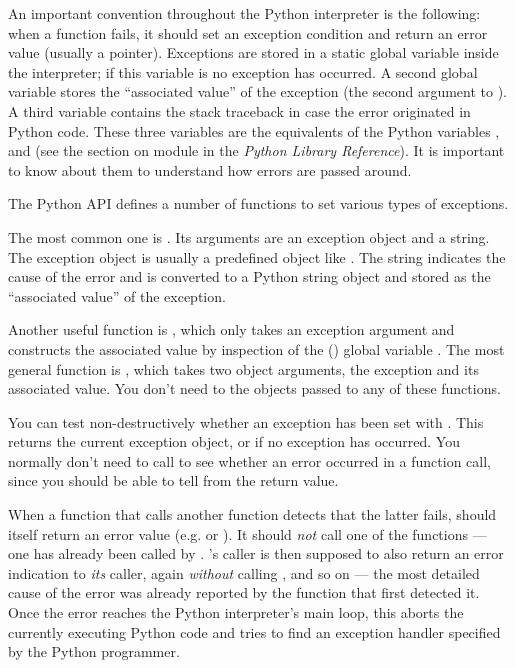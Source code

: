 \documentclass{manual}
\begin{document}
An important convention throughout the Python interpreter is the
following: when a function fails, it should set an exception condition
and return an error value (usually a \NULL{} pointer).  Exceptions
are stored in a static global variable inside the interpreter; if this
variable is \NULL{} no exception has occurred.  A second global
variable stores the ``associated value'' of the exception (the second
argument to ).  A third variable contains the stack
traceback in case the error originated in Python code.  These three
variables are the \C{} equivalents of the Python variables
,  and 
(see the section on module  in the \emph{Python Library
Reference}).  It is important to know about them to understand how
errors are passed around.

The Python API defines a number of functions to set various types of
exceptions.

The most common one is .  Its arguments
are an exception object and a \C{} string.  The exception object is
usually a predefined object like .  The
\C{} string indicates the cause of the error and is converted to a
Python string object and stored as the ``associated value'' of the
exception.

Another useful function is , which only
takes an exception argument and constructs the associated value by
inspection of the (\UNIX{}) global variable .  The most
general function is , which takes two object
arguments, the exception and its associated value.  You don't need to
 the objects passed to any of these functions.

You can test non-destructively whether an exception has been set with
.  This returns the current exception object,
or \NULL{} if no exception has occurred.  You normally don't need
to call  to see whether an error occurred in a
function call, since you should be able to tell from the return value.

When a function  that calls another function  detects
that the latter fails,  should itself return an error value
(e.g. \NULL{} or ).  It should \emph{not} call one of the
 functions --- one has already been called by .
's caller is then supposed to also return an error indication
to \emph{its} caller, again \emph{without} calling ,
and so on --- the most detailed cause of the error was already
reported by the function that first detected it.  Once the error
reaches the Python interpreter's main loop, this aborts the currently
executing Python code and tries to find an exception handler specified
by the Python programmer.
\end{document}
